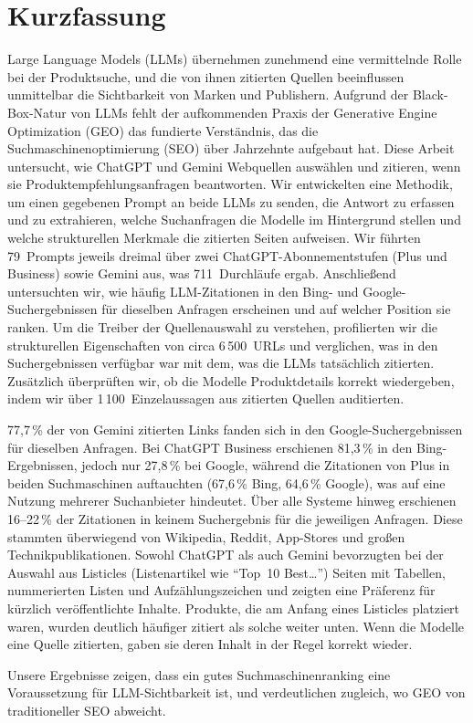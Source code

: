 \chapter{Kurzfassung}

Large Language Models (LLMs) übernehmen zunehmend eine vermittelnde Rolle bei der Produktsuche, und die von ihnen zitierten Quellen beeinflussen unmittelbar die Sichtbarkeit von Marken und Publishern. Aufgrund der Black-Box-Natur von LLMs fehlt der aufkommenden Praxis der Generative Engine Optimization (GEO) das fundierte Verständnis, das die Suchmaschinenoptimierung (SEO) über Jahrzehnte aufgebaut hat. Diese Arbeit untersucht, wie ChatGPT und Gemini Webquellen auswählen und zitieren, wenn sie Produktempfehlungsanfragen beantworten. Wir entwickelten eine Methodik, um einen gegebenen Prompt an beide LLMs zu senden, die Antwort zu erfassen und zu extrahieren, welche Suchanfragen die Modelle im Hintergrund stellen und welche strukturellen Merkmale die zitierten Seiten aufweisen. Wir führten 79~Prompts jeweils dreimal über zwei ChatGPT-Abonnementstufen (Plus und Business) sowie Gemini aus, was 711~Durchläufe ergab. Anschließend untersuchten wir, wie häufig LLM-Zitationen in den Bing- und Google-Suchergebnissen für dieselben Anfragen erscheinen und auf welcher Position sie ranken. Um die Treiber der Quellenauswahl zu verstehen, profilierten wir die strukturellen Eigenschaften von circa 6\,500~URLs und verglichen, was in den Suchergebnissen verfügbar war mit dem, was die LLMs tatsächlich zitierten. Zusätzlich überprüften wir, ob die Modelle Produktdetails korrekt wiedergeben, indem wir über 1\,100~Einzelaussagen aus zitierten Quellen auditierten.

77,7\,\% der von Gemini zitierten Links fanden sich in den Google-Suchergebnissen für dieselben Anfragen. Bei ChatGPT Business erschienen 81,3\,\% in den Bing-Ergebnissen, jedoch nur 27,8\,\% bei Google, während die Zitationen von Plus in beiden Suchmaschinen auftauchten (67,6\,\% Bing, 64,6\,\% Google), was auf eine Nutzung mehrerer Suchanbieter hindeutet. Über alle Systeme hinweg erschienen 16--22\,\% der Zitationen in keinem Suchergebnis für die jeweiligen Anfragen. Diese stammten überwiegend von Wikipedia, Reddit, App-Stores und großen Technikpublikationen. Sowohl ChatGPT als auch Gemini bevorzugten bei der Auswahl aus Listicles (Listenartikel wie "`Top~10 Best\ldots"') Seiten mit Tabellen, nummerierten Listen und Aufzählungszeichen und zeigten eine Präferenz für kürzlich veröffentlichte Inhalte. Produkte, die am Anfang eines Listicles platziert waren, wurden deutlich häufiger zitiert als solche weiter unten. Wenn die Modelle eine Quelle zitierten, gaben sie deren Inhalt in der Regel korrekt wieder.

Unsere Ergebnisse zeigen, dass ein gutes Suchmaschinenranking eine Voraussetzung für LLM-Sichtbarkeit ist, und verdeutlichen zugleich, wo GEO von traditioneller SEO abweicht.
